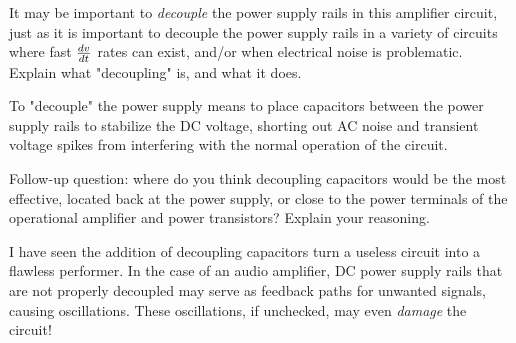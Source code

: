 

It may be important to {\it decouple} the power supply rails in this amplifier circuit, just as it is important to decouple the power supply rails in a variety of circuits where fast $dv \over dt$ rates can exist, and/or when electrical noise is problematic.  Explain what "decoupling" is, and what it does.







To "decouple" the power supply means to place capacitors between the power supply rails to stabilize the DC voltage, shorting out AC noise and transient voltage spikes from interfering with the normal operation of the circuit.  

\vskip 10pt

Follow-up question: where do you think decoupling capacitors would be the most effective, located back at the power supply, or close to the power terminals of the operational amplifier and power transistors?  Explain your reasoning.







I have seen the addition of decoupling capacitors turn a useless circuit into a flawless performer.  In the case of an audio amplifier, DC power supply rails that are not properly decoupled may serve as feedback paths for unwanted signals, causing oscillations.  These oscillations, if unchecked, may even {\it damage} the circuit!



